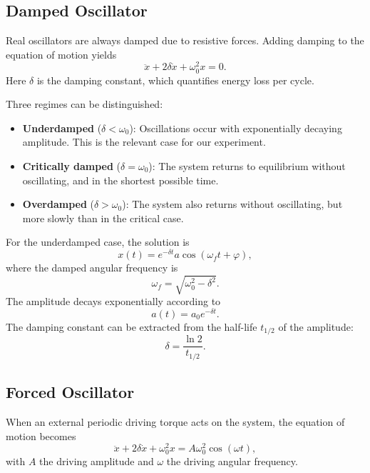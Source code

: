 \subsection{Damped Oscillator}
Real oscillators are always damped due to resistive forces. Adding damping to the equation of motion yields
\begin{equation}
\ddot{x} + 2 \delta \dot{x} + \omega_0^2 x = 0.
\end{equation}
Here $\delta$ is the damping constant, which quantifies energy loss per cycle.  

Three regimes can be distinguished:
\begin{itemize}
    \item \textbf{Underdamped} ($\delta < \omega_0$): Oscillations occur with exponentially decaying amplitude. This is the relevant case for our experiment.
    \item \textbf{Critically damped} ($\delta = \omega_0$): The system returns to equilibrium without oscillating, and in the shortest possible time.
    \item \textbf{Overdamped} ($\delta > \omega_0$): The system also returns without oscillating, but more slowly than in the critical case.
\end{itemize}

For the underdamped case, the solution is
\begin{equation}
x(t) = e^{-\delta t} a \cos(\omega_f t + \varphi),
\end{equation}
where the damped angular frequency is
\begin{equation}
\omega_f = \sqrt{\omega_0^2 - \delta^2}.
\end{equation}
The amplitude decays exponentially according to
\begin{equation}
a(t) = a_0 e^{-\delta t}.
\end{equation}
The damping constant can be extracted from the half-life $t_{1/2}$ of the amplitude:
\begin{equation}
    \delta = \frac{\ln 2}{t_{1/2}}.
    \label{eq:damping_halftime}
\end{equation}

\subsection{Forced Oscillator}
When an external periodic driving torque acts on the system, the equation of motion becomes
\begin{equation}
\ddot{x} + 2\delta \dot{x} + \omega_0^2 x = A \omega_0^2 \cos(\omega t),
\end{equation}
with $A$ the driving amplitude and $\omega$ the driving angular frequency.  

